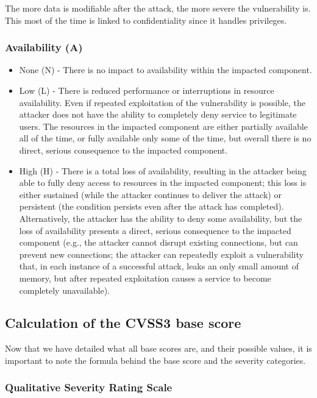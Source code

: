 The more data is modifiable after the attack, the more severe the vulnerability is. This most of the time is linked to confidentiality since it handles privileges.

\subsubsection{Availability (A)}

\begin{itemize}
	\item None (N) - There is no impact to availability within the impacted component.
	\item Low (L) - There is reduced performance or interruptions in resource availability. Even if repeated exploitation of the vulnerability is possible, the attacker does not have the ability to completely deny service to legitimate users. The resources in the impacted component are either partially available all of the time, or fully available only some of the time, but overall there is no direct, serious consequence to the impacted component.
	\item High (H) - There is a total loss of availability, resulting in the attacker being able to fully deny access to resources in the impacted component; this loss is either sustained (while the attacker continues to deliver the attack) or persistent (the condition persists even after the attack has completed). Alternatively, the attacker has the ability to deny some availability, but the loss of availability presents a direct, serious consequence to the impacted component (e.g., the attacker cannot disrupt existing connections, but can prevent new connections; the attacker can repeatedly exploit a vulnerability that, in each instance of a successful attack, leaks an only small amount of memory, but after repeated exploitation causes a service to become completely unavailable).
\end{itemize}

\subsection{Calculation of the CVSS3 base score}

Now that we have detailed what all base scores are, and their possible values, it is important to note the formula behind the base score and the severity categories.

\subsubsection{Qualitative Severity Rating Scale}

